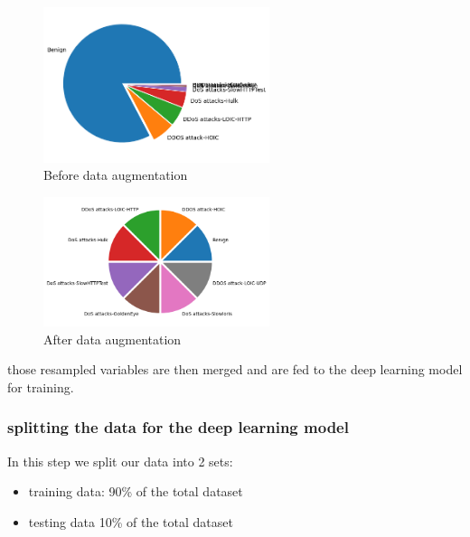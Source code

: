 \begin{figure}[h]
	\centering
	\includegraphics[width=250px]{figures/unbalanced_donut.png}
	\caption{Before data augmentation}
	\label{fig:datasample}
\end{figure}
\begin{figure}[h]
	\centering
	\includegraphics[width=250px]{figures/balanced_donut.png}
	\caption{After data augmentation}
	\label{fig:datasample}
\end{figure}

those resampled variables are then merged and are fed to the deep learning model for training.





\subsubsection{splitting the data for the deep learning model}
In this step we split our data into 2 sets:
\begin{itemize}
	\item training data: 90\% of the total dataset
	\item testing data 10\% of the total dataset
\end{itemize}

















